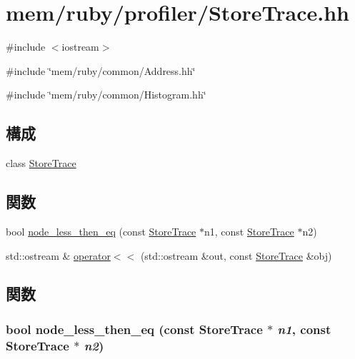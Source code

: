 \hypertarget{StoreTrace_8hh}{
\section{mem/ruby/profiler/StoreTrace.hh}
\label{StoreTrace_8hh}
}
{\ttfamily \#include $<$iostream$>$}\par
{\ttfamily \#include \char`\"{}mem/ruby/common/Address.hh\char`\"{}}\par
{\ttfamily \#include \char`\"{}mem/ruby/common/Histogram.hh\char`\"{}}\par
\subsection*{構成}
\begin{DoxyCompactItemize}
\item 
class \hyperlink{classStoreTrace}{StoreTrace}
\end{DoxyCompactItemize}
\subsection*{関数}
\begin{DoxyCompactItemize}
\item 
bool \hyperlink{StoreTrace_8hh_a6a8ec6a9bd700810631ab94668654546}{node\_\-less\_\-then\_\-eq} (const \hyperlink{classStoreTrace}{StoreTrace} $\ast$n1, const \hyperlink{classStoreTrace}{StoreTrace} $\ast$n2)
\item 
std::ostream \& \hyperlink{StoreTrace_8hh_a456db4dc629df86f8a035676fd294345}{operator$<$$<$} (std::ostream \&out, const \hyperlink{classStoreTrace}{StoreTrace} \&obj)
\end{DoxyCompactItemize}


\subsection{関数}
\hypertarget{StoreTrace_8hh_a6a8ec6a9bd700810631ab94668654546}{
\subsubsection[{node\_\-less\_\-then\_\-eq}]{\setlength{\rightskip}{0pt plus 5cm}bool node\_\-less\_\-then\_\-eq (const {\bf StoreTrace} $\ast$ {\em n1}, \/  const {\bf StoreTrace} $\ast$ {\em n2})}}
\label{StoreTrace_8hh_a6a8ec6a9bd700810631ab94668654546}



